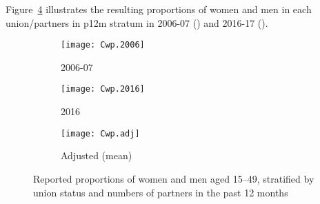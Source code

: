 Figure~\ref{fig:Cwp} illustrates the resulting
proportions of women and men in each union/partners in p12m stratum
in 2006-07 () and 2016-17 ().
\begin{figure}
  \centering
  \begin{subfigure}{0.7\linewidth}
    \centering
    \texttt{[image: Cwp.2006]}
    \caption{2006-07 \cite{SDHS2006}}
    \label{fig:Cwp.2006}
  \end{subfigure}
  \begin{subfigure}{0.7\linewidth}
    \centering
    \texttt{[image: Cwp.2016]}
    \caption{2016 \cite{SHIMS2}}
    \label{fig:Cwp.2016}
  \end{subfigure}
  \begin{subfigure}{0.7\linewidth}
    \centering
    \texttt{[image: Cwp.adj]}
    \caption{Adjusted (mean)}
    \label{fig:Cwp.adj}
  \end{subfigure}
  \caption{Reported proportions of women and men aged 15--49,
    stratified by union status and numbers of partners in the past 12 months}
  \label{fig:Cwp}
\end{figure}
